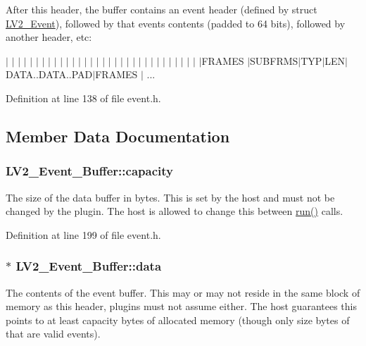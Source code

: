 After this header, the buffer contains an event header (defined by struct \hyperlink{struct_l_v2___event}{L\+V2\+\_\+\+Event}), followed by that event\textquotesingle{}s contents (padded to 64 bits), followed by another header, etc\+:

$\vert$ $\vert$ $\vert$ $\vert$ $\vert$ $\vert$ $\vert$ $\vert$ $\vert$ $\vert$ $\vert$ $\vert$ $\vert$ $\vert$ $\vert$ $\vert$ $\vert$ $\vert$ $\vert$ $\vert$ $\vert$ $\vert$ $\vert$ $\vert$ $\vert$ $\vert$ $\vert$ $\vert$ $\vert$ $\vert$ $\vert$ $\vert$ $\vert$\+F\+R\+A\+M\+ES $\vert$\+S\+U\+B\+F\+R\+M\+S$\vert$\+T\+Y\+P$\vert$\+L\+E\+N$\vert$\+D\+A\+TA..D\+A\+TA..P\+A\+D$\vert$\+F\+R\+A\+M\+ES $\vert$ ... 

Definition at line 138 of file event.\+h.



\subsection{Member Data Documentation}
\subsubsection[{\texorpdfstring{capacity}{capacity}}]{ L\+V2\+\_\+\+Event\+\_\+\+Buffer\+::capacity}\hypertarget{struct_l_v2___event___buffer_ab5d1551ce2b049bd4b7c8840996b9b3f}{}\label{struct_l_v2___event___buffer_ab5d1551ce2b049bd4b7c8840996b9b3f}
The size of the data buffer in bytes. This is set by the host and must not be changed by the plugin. The host is allowed to change this between \hyperlink{namespacewaflib_1_1_task_a859c6336afe027ae782f84b9e49a4f0f}{run()} calls. 

Definition at line 199 of file event.\+h.

\subsubsection[{\texorpdfstring{data}{data}}]{$\ast$ L\+V2\+\_\+\+Event\+\_\+\+Buffer\+::data}\hypertarget{struct_l_v2___event___buffer_af00623cdbbddc31900cb377fb562f576}{}\label{struct_l_v2___event___buffer_af00623cdbbddc31900cb377fb562f576}
The contents of the event buffer. This may or may not reside in the same block of memory as this header, plugins must not assume either. The host guarantees this points to at least capacity bytes of allocated memory (though only size bytes of that are valid events). 

